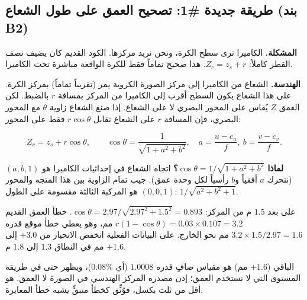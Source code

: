 \documentclass[11pt,a4paper]{article}
\newcommand{\en}[1]{\textenglish{#1}}
\begin{document}
\subsection{طريقة جديدة \#1: تصحيح العمق على طول الشعاع (بند \en{B2})}
\textbf{المشكلة.} الكاميرا ترى سطح الكرة، ونحن نريد مركزها. الكود القديم كان يضيف نصف القطر كاملاً: $Z_c=z_s+r$. هذا صحيح تماماً
فقط للكرة الواقعة مباشرة تحت الكاميرا.

\textbf{الهندسة.} الشعاع من الكاميرا إلى مركز الصورة الكروية يمر (تقريباً تماماً) بمركز الكرة. على هذا الشعاع يكون السطح
أقرب إلى الكاميرا من المركز بمسافة $r$ بالضبط. لكن العمق $Z$ يُقاس على المحور البصري لا على الشعاع. إذا صنع الشعاع زاوية
$\theta$ مع المحور البصري، فإن المسافة $r$ على الشعاع تقابل $r\cos\theta$ فقط على المحور:

\begin{LTR}
\begin{center}
\end{center}
\end{LTR}

\[ Z_c=z_s+r\cos\theta,\qquad \cos\theta=\frac{1}{\sqrt{1+a^2+b^2}},\quad a=\frac{u-c_u}{f},\ b=\frac{v-c_v}{f}. \]

\textbf{لماذا $\cos\theta=1/\sqrt{1+a^2+b^2}$؟} اتجاه الشعاع في إحداثيات الكاميرا هو $(a,b,1)$ (نتحرك $a$ أفقياً و$b$ رأسياً لكل
وحدة عمق). جيب تمام الزاوية بين هذا المتجه والمحور $(0,0,1)$ هو المركبة الثالثة مقسومة على الطول: $1/\sqrt{a^2+b^2+1}$.

\begin{example}
على بعد $1.5$ م من المركز: $\cos\theta=2.97/\sqrt{2.97^2+1.5^2}=0.893$. خطأ العمق القديم $r(1-\cos\theta)=0.03\times0.107=3.2$ مم،
وهو يعطي خطأ موقع قدره $3.2\times1.5/2.97=1.6$ مم نحو الخارج. على البيانات الفعلية انخفض الانحياز من $+3.0$ إلى $+1.6$ مم
في النطاق $1.3$ إلى $1.8$ م.

الباقي ($+1.6$ مم) هو مقياس صافٍ قدره $1.0008$ (أي $0.08\%$)، ويظهر حتى في طريقة المستوى التي لا تستخدم العمق؛ إذن مصدره المركز
الهندسي في الصورة لا العمق. هو أقل من ثلث بكسل، فوُثِّق كخطأ متبقٍّ يشبه خطأ المعايرة.
\end{example}
\end{document}
